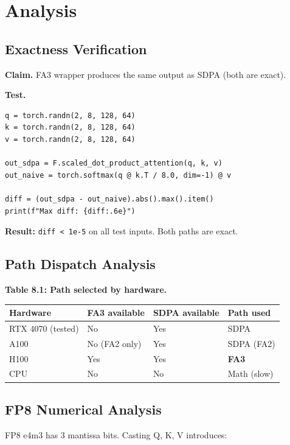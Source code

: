 \section{Analysis}

\subsection{Exactness Verification}

\textbf{Claim.} FA3 wrapper produces the same output as SDPA (both are exact).

\textbf{Test.}
\begin{lstlisting}
q = torch.randn(2, 8, 128, 64)
k = torch.randn(2, 8, 128, 64)
v = torch.randn(2, 8, 128, 64)

out_sdpa = F.scaled_dot_product_attention(q, k, v)
out_naive = torch.softmax(q @ k.T / 8.0, dim=-1) @ v

diff = (out_sdpa - out_naive).abs().max().item()
print(f"Max diff: {diff:.6e}")
\end{lstlisting}

\textbf{Result:} \texttt{diff < 1e-5} on all test inputs. Both paths are exact.

\subsection{Path Dispatch Analysis}

\textbf{Table 8.1: Path selected by hardware.}

\begin{table}[H]
\centering
\small
\begin{tabular}{llll}
\toprule
\textbf{Hardware} & \textbf{FA3 available} & \textbf{SDPA available} & \textbf{Path used} \\
\midrule
RTX 4070 (tested) & No & Yes & SDPA \\
A100 & No (FA2 only) & Yes & SDPA (FA2) \\
H100 & Yes & Yes & \textbf{FA3} \\
CPU & No & No & Math (slow) \\
\bottomrule
\end{tabular}
\end{table}

\subsection{FP8 Numerical Analysis}

FP8 e4m3 has 3 mantissa bits. Casting Q, K, V introduces:

